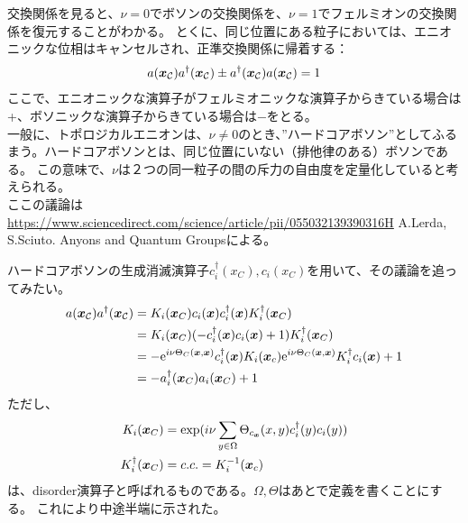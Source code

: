 \documentclass[a4paper,11pt]{jsarticle}
\numberwithin{equation}{section}
\begin{document}
交換関係を見ると、$\nu=0$でボソンの交換関係を、$\nu=1$でフェルミオンの交換関係を復元することがわかる。
とくに、同じ位置にある粒子においては、エニオニックな位相はキャンセルされ、正準交換関係に帰着する：
\begin{align}
  a(\vb*{x}_\mathcal{C})a^{\dag}(\vb*{x}_\mathcal{C})\pm a^{\dag}(\vb*{x}_\mathcal{C})a(\vb*{x}_\mathcal{C})=1\\
\end{align}
ここで、エニオニックな演算子がフェルミオニックな演算子からきている場合は+、ボソニックな演算子からきている場合は$-$をとる。\\
一般に、トポロジカルエニオンは、$\nu\neq0$のとき、”ハードコアボソン”としてふるまう。ハードコアボソンとは、同じ位置にいない（排他律のある）ボソンである。
この意味で、$\nu$は２つの同一粒子の間の斥力の自由度を定量化していると考えられる。\\
ここの議論は\url{https://www.sciencedirect.com/science/article/pii/055032139390316H}{ A.Lerda, S.Sciuto. Anyons and Quantum Groups}による。

ハードコアボソンの生成消滅演算子$c_i^{\dag}(x_C),c_i(x_C)$を用いて、その議論を追ってみたい。
\begin{align}
  a(\vb*{x}_\mathcal{C})a^{\dag}(\vb*{x}_\mathcal{C})&=K_i(\vb*{x}_C)c_i(\vb*{x})c_i^{\dag}(\vb*{x})K_i^{\dag}(\vb*{x}_C)\\
  &=K_i(\vb*{x}_C)(-c_i^{\dag}(\vb*{x})c_i(\vb*{x})+1)K_i^{\dag}(\vb*{x}_C)\\
  &=-\mathrm{e}^{i\nu\Theta_C(\vb*{x},\vb*{x})}c_i^{\dag}(\vb*{x})K_i(\vb*{x}_c)\mathrm{e}^{i\nu\Theta_C(\vb*{x},\vb*{x})}K_i^{\dag}c_i(\vb*{x})+1\\
  &=-a_i^{\dag}(\vb*{x}_C)a_i(\vb*{x}_C)+1
\end{align}
ただし、
\begin{align}
 K_i(\vb*{x}_C)&=\mathrm{exp}(i\nu\sum_{y\in\Omega}\Theta_{c_{\vb*{x}}}(x,y)c_i^{\dag}(y)c_i(y))\\
K_i^{\dag}(\vb*{x}_C)&=c.c.=K_i^{-1}(\vb*{x}_c)
\end{align}
は、disorder演算子と呼ばれるものである。$\Omega,\Theta$はあとで定義を書くことにする。
これにより中途半端に示された。
\end{document}
